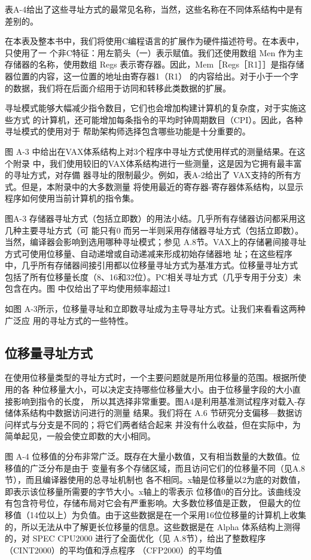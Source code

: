 表A-4给出了这些寻址方式的最常见名称，当然，这些名称在不同体系结构中是有差别的。

在本表及整本书中，我们将使用C编程语言的扩展作为硬件描述符号。在本表中，只使用了一
个非C特征：用左箭头（一）表示赋值。我们还使用数组 Men 作为主存储器的名称，使用数组
Regs 表示寄存器。因此，Mem［Regs［R1］］是指存储器位置的内容，这一位置的地址由寄存器1（R1）
的内容给出。对于小于一个字的数据，我们将在后面介绍用于访同和转移此类数据的扩展。

寻址模式能够大幅减少指令数目，它们也会增加构建计算机的复杂度，对于实施这些方式
的计算机，还可能增加每条指令的平均时钟周期数目（CPI）。因此，各种寻址模式的使用对于
帮助架构师选择包含哪些功能是十分重要的。

图 A-3 中给出在VAX体系结构上对3个程序中寻址方式使用样式的测量结果。在这个附录
中，我们使用较旧的VAX体系结构进行一些测量，这是因为它拥有最丰富的寻址方式，对存備
器寻址的限制最少。例如，表A-2给出了 VAX支持的所有方式。但是，本附录中的大多数测量
将使用最近的寄存器-寄存器体系结构，以显示程序如何使用当前计算机的指令集。

图A-3 存储器寻址方式（包括立即数）的用法小结。几乎所有存储器访问都采用这几种主要寻址方式（可
能只有0%
而另一半则采用存储器寻址方式（包括立即数）。当然，编译器会影响到选用哪种寻址模式；参见
A.8节。VAX上的存储暑间接寻址方式可使用位移量、自动递增或自动递减来形成初始存储器地
址；在这些程序中，几乎所有存储器间接引用都以位移量寻址方式为基准方式。位移量寻址方式
包括了所有位移量长度（8、16和32位）。PC相关寻址方式（几乎专用于分支）未包含在内。图
中仅给出了平均使用频率超过1%

如图 A-3所示，位移量寻址和立即数寻址成为主导寻址方式。让我们来看看这两种广泛应
用的寻址方式的一些特性。

\subsection{位移量寻址方式}
在使用位移量类型的寻址方式时，一个主要问题就是所用位移量的范围。根据所使用的各
种位移量大小，可以决定支持哪些位移量大小。由于位移量字段的大小直接影响到指令的长度，
所以其选择非常重要。图A4是利用基准测试程序对载入-存储体系结构中数据访问进行的测量
结果。我们将在 A.6 节研究分支偏移—数据访问样式与分支是不同的；将它们两者结合起来
并没有什么收益，但在实际中，为简单起见，一般会使立即数的大小相同。

图 A-4 位移值的分布非常广泛。既存在大量小数值，又有相当数量的大数值。位移值的广泛分布是由于
变量有多个存储区域，而且访问它们的位移量不同（见A.8节），而且编译器使用的总寻址机制也
各不相同。x轴是位移量以2为底的对数值，即表示该位移量所需要的字节大小。x轴上的零表示
位移值0的百分比。该曲线没有包含符号位，存储布局对它会有严重影响。大多数位移值是正数，
但最大的位移值（14位以上）为负值。由于这些数据是在一个采用16位位移量的计算机上收集
的，所以无法从中了解更长位移量的信息。这些数据是在 Alpha 体系结构上测得的，对 SPEC
CPU2000 进行了全面优化（见 A.8节），给出了整数程序（CINT2000）的平均值和浮点程序
（CFP2000）的平均值


